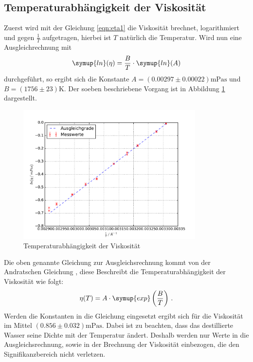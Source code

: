 \subsection{Temperaturabhängigkeit der Viskosität}
Zuerst wird mit der Gleichung \eqref{eqn:eta1} die Viskosität brechnet, logarithmiert
und gegen $\frac{1}{T}$ aufgetragen, hierbei ist $T$ natürlich die Temperatur.
Wird nun eine Ausgleichrechnung mit
\begin{equation*}
  \symup{ln}(\eta)= \frac{B}{T}\cdot\symup{ln}(A)
\end{equation*}
durchgeführt, so ergibt sich die Konstante $ A =  (0.00297 \pm 0.00022)
\si{\milli\pascal\second}$ und $B = (1756 \pm 23) \si{\kelvin}$. Der soeben
beschriebene Vorgang ist in Abbildung \ref{fig:plot} dargestellt.
\begin{figure}
  \centering
  \includegraphics[height= 7cm]{Plots/plot.pdf}
  \caption{Temperaturabhängigkeit der Viskosität}
  \label{fig:plot}
\end{figure}
Die oben genannte Gleichung zur Ausgleichsrechnung kommt von der Andratschen
Gleichung \cite{Anleitung}, diese Beschreibt die Temperaturabhängigkeit der
Viskosität wie folgt:
\begin{equation*}
  \eta(T) = A\cdot \symup{exp}\left(\frac{B}{T}\right)\,.
\end{equation*}
Werden die Konstanten in die Gleichung eingesetzt ergibt sich für die Viskosität
im Mittel $(0.856 \pm 0.032) \si{\milli\pascal\second}$. Dabei ist zu beachten,
dass das destillierte Wasser seine Dichte mit der Temperatur ändert. Deshalb
werden nur Werte in die Ausgleichsrechnung, sowie in der Brechnung der
Viskosität einbezogen, die den Signifikanzbereich nicht verletzen.
